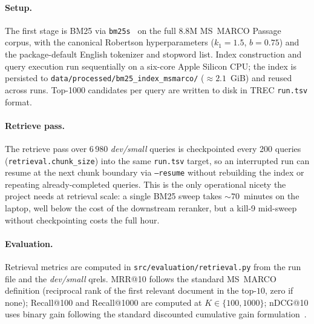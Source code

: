 \documentclass[11pt,a4paper]{article}
\makeatletter
\newcommand{\devsmall}{\textit{dev/small}}
\newcommand{\fdev}{6\,980}
\newcommand{\msmarco}{MS~MARCO}
\newcommand{\mrr}{MRR@10}
\newcommand{\ndcg}{nDCG@10}
\newcommand{\recallH}{Recall@100}
\newcommand{\recallK}{Recall@1000}
\newcommand{\bmtwofive}{BM25}
\makeatother
\begin{document}
\paragraph{Setup.}  The first stage is \bmtwofive{} via
\texttt{bm25s}~\cite{lu2024bm25s} on the full 8.8M \msmarco{}
Passage corpus, with the canonical Robertson hyperparameters
($k_1=1.5$, $b=0.75$) and the package-default English tokenizer and
stopword list.  Index construction and query execution run
sequentially on a six-core Apple Silicon CPU; the index is persisted
to \texttt{data/processed/bm25\_index\_msmarco/} ($\approx\!2.1$~GiB)
and reused across runs.  Top-1000 candidates per query are written
to disk in TREC \texttt{run.tsv} format.

\paragraph{Retrieve pass.}  The retrieve pass over \fdev{}
\devsmall{} queries is checkpointed every 200 queries
(\texttt{retrieval.chunk\_size}) into the same \texttt{run.tsv}
target, so an interrupted run can resume at the next chunk boundary
via \texttt{--resume} without rebuilding the index or repeating
already-completed queries.  This is the only operational nicety the
project needs at retrieval scale: a single \bmtwofive{} sweep takes
$\sim\!70$~minutes on the laptop, well below the cost of the
downstream reranker, but a kill-9 mid-sweep without checkpointing
costs the full hour.

\paragraph{Evaluation.}  Retrieval metrics are computed in
\texttt{src/evaluation/retrieval.py} from the run file and the
\devsmall{} qrels.  \mrr{} follows the standard \msmarco{}
definition (reciprocal rank of the first relevant document in the
top-$10$, zero if none); \recallH{} and \recallK{} are computed at
$K\!\in\!\{100,1000\}$; \ndcg{} uses binary gain following the
standard discounted cumulative gain formulation~\cite{jarvelin2002ndcg}.
\end{document}
